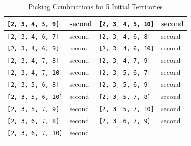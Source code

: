 \begin{longtable}{|p{3.5cm}|p{2.5cm}||p{3.5cm}|p{2.5cm}|}
\texttt{[2, 3, 4, 5, 9]} & \textcolor{CustomBlue}{second} & \texttt{[2, 3, 4, 5, 10]} & \textcolor{CustomBlue}{second} \\ \hline
\texttt{[2, 3, 4, 6, 7]} & \textcolor{CustomBlue}{second} & \texttt{[2, 3, 4, 6, 8]} & \textcolor{CustomBlue}{second} \\ \hline
\texttt{[2, 3, 4, 6, 9]} & \textcolor{CustomBlue}{second} & \texttt{[2, 3, 4, 6, 10]} & \textcolor{CustomBlue}{second} \\ \hline
\texttt{[2, 3, 4, 7, 8]} & \textcolor{CustomBlue}{second} & \texttt{[2, 3, 4, 7, 9]} & \textcolor{CustomBlue}{second} \\ \hline
\texttt{[2, 3, 4, 7, 10]} & \textcolor{CustomBlue}{second} & \texttt{[2, 3, 5, 6, 7]} & \textcolor{CustomBlue}{second} \\ \hline
\texttt{[2, 3, 5, 6, 8]} & \textcolor{CustomBlue}{second} & \texttt{[2, 3, 5, 6, 9]} & \textcolor{CustomBlue}{second} \\ \hline
\texttt{[2, 3, 5, 6, 10]} & \textcolor{CustomBlue}{second} & \texttt{[2, 3, 5, 7, 8]} & \textcolor{CustomBlue}{second} \\ \hline
\texttt{[2, 3, 5, 7, 9]} & \textcolor{CustomBlue}{second} & \texttt{[2, 3, 5, 7, 10]} & \textcolor{CustomBlue}{second} \\ \hline
\texttt{[2, 3, 6, 7, 8]} & \textcolor{CustomBlue}{second} & \texttt{[2, 3, 6, 7, 9]} & \textcolor{CustomBlue}{second} \\ \hline
\texttt{[2, 3, 6, 7, 10]} & \textcolor{CustomBlue}{second} & & \\ \hline

\caption{Picking Combinations for 5 Initial Territories}
\label{tab:5territories}
\end{longtable}

\normalsize

